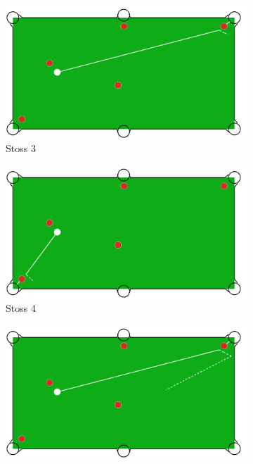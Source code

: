 \begin{figure}[h!]
\begin{subfigure}[b]{0.3\textwidth}
        \includegraphics[width=1.0\linewidth]{../common/04_results/resources/simple_search/situation_diverse_solution_velocity_3.PNG}
        \caption{Stoss 3}
        \label{fig:situation_velocity_1_solution_3}
    \end{subfigure}
    \hfill
    \begin{subfigure}[b]{0.3\textwidth}
        \centering
        \includegraphics[width=1.0\linewidth]{../common/04_results/resources/simple_search/situation_diverse_solution_velocity_4.PNG}
        \caption{Stoss 4}
        \label{fig:situation_velocity_1_solution_4}
    \end{subfigure}
    \hfill
    \begin{subfigure}[b]{0.3\textwidth}
        \centering
        \includegraphics[width=1.0\linewidth]{../common/04_results/resources/simple_search/situation_diverse_solution_velocity_5.PNG}

\end{subfigure}
\end{figure}
